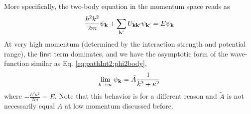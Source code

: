 More specifically, the two-body \sch equation in the momentum space reads as 
\begin{equation}
\frac{\hbar^{2}k^{2}}{2m}\psi_{\mathbf{k}}+\sum_{\mathbf{k}'}U_{\mathbf{k}\mathbf{k}'}\psi_{\mathbf{k}'}=E\psi_{\mathbf{k}}
\end{equation}
At very high momentum (determined by the interaction strength and  potential range), the first term dominates, and we have the asymptotic form of the wave-function similar as Eq. \ref{eq:pathInt2:phi2body},
\begin{equation}
\lim_{k\rightarrow\infty}\psi_{\mathbf{k}}=\tilde{A}\frac{1}{k^{2}+\kappa^{2}}
\end{equation}
where $-\frac{\hbar^{2}\kappa^{2}}{2m}=E$.  Note that this behavior is for a different reason and $\tilde{A}$ is not necessarily equal $A$ at low momentum discussed before.  



